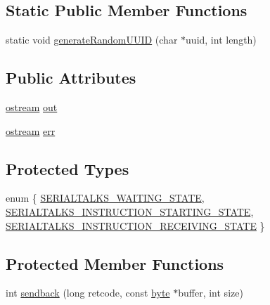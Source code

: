 \subsection*{Static Public Member Functions}
\begin{DoxyCompactItemize}
\item 
static void \hyperlink{class_serial_talks_a08807e3d40b70042f9b88504216245e0}{generate\+Random\+U\+U\+ID} (char $\ast$uuid, int length)
\end{DoxyCompactItemize}
\subsection*{Public Attributes}
\begin{DoxyCompactItemize}
\item 
\hyperlink{classostream}{ostream} \hyperlink{class_serial_talks_adcce1950be020551b2acfac6c912bbb8}{out}
\item 
\hyperlink{classostream}{ostream} \hyperlink{class_serial_talks_ad0f3d8029336f8f3e0522c18de8206fd}{err}
\end{DoxyCompactItemize}
\subsection*{Protected Types}
\begin{DoxyCompactItemize}
\item 
enum \{ \hyperlink{class_serial_talks_aa0ccaa2c5993aa8989e592eee55de2b2a07d4b82adf8bfbd008a9f02bd9f92edc}{S\+E\+R\+I\+A\+L\+T\+A\+L\+K\+S\+\_\+\+W\+A\+I\+T\+I\+N\+G\+\_\+\+S\+T\+A\+TE}, 
\hyperlink{class_serial_talks_aa0ccaa2c5993aa8989e592eee55de2b2a3f57d939c8568b615523f51378deca27}{S\+E\+R\+I\+A\+L\+T\+A\+L\+K\+S\+\_\+\+I\+N\+S\+T\+R\+U\+C\+T\+I\+O\+N\+\_\+\+S\+T\+A\+R\+T\+I\+N\+G\+\_\+\+S\+T\+A\+TE}, 
\hyperlink{class_serial_talks_aa0ccaa2c5993aa8989e592eee55de2b2a3b63d11137aef55d7bc7636619609b8e}{S\+E\+R\+I\+A\+L\+T\+A\+L\+K\+S\+\_\+\+I\+N\+S\+T\+R\+U\+C\+T\+I\+O\+N\+\_\+\+R\+E\+C\+E\+I\+V\+I\+N\+G\+\_\+\+S\+T\+A\+TE}
 \}
\end{DoxyCompactItemize}
\subsection*{Protected Member Functions}
\begin{DoxyCompactItemize}
\item 
int \hyperlink{class_serial_talks_a19f503e1040f6e8f157b4ff579343f62}{sendback} (long retcode, const \hyperlink{serialutils_8h_a0c8186d9b9b7880309c27230bbb5e69d}{byte} $\ast$buffer, int size)
\end{DoxyCompactItemize}
